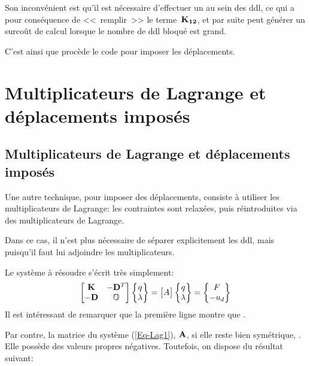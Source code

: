 Son inconvénient est qu'il est nécessaire d'effectuer un  au sein des ddl, ce qui a pour conséquence de 
<<~remplir~>> le terme~$\MM{K_{12}}$, et par suite peut générer un surcoût de calcul lorsque le nombre de ddl bloqué
est grand.

C'est ainsi que procède le code \abaqus pour imposer les déplacements.

\medskip
\ifVersionAvecExemplesSepares
  \section{Multiplicateurs de Lagrange et déplacements imposés}\label{Sec-cast}
\else
  \subsection{Multiplicateurs de Lagrange et déplacements imposés}\label{Sec-cast}
\fi

Une autre technique, pour imposer des déplacements, consiste à utiliser les multiplicateurs de Lagrange: les contraintes sont relaxées, puis réintroduites via des multiplicateurs de Lagrange.

Dans ce cas, il n'est plus nécessaire de séparer explicitement les ddl, mais  puisqu'il faut lui adjoindre les multiplicateurs.

Le système à résoudre s'écrit très simplement:
\begin{equation}\label{Eq-Lag1}
\MM*{\MM{K} & -\MM{D}^T\\ -\MM{D} & \mO{}}
\VV*{q\\ \lambda} =
\MM*{A}
\VV*{q\\ \lambda} =
\VV*{F\\ -u_d}
\end{equation}
Il est intéressant de remarquer que la première ligne montre que .

Par contre, la matrice du système (\ref{Eq-Lag1}), $\MM{A}$, si elle reste bien symétrique, . Elle possède des valeurs propres négatives.
\medskipvm
Toutefois, on dispose du résultat suivant:

